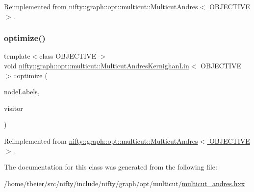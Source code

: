 Reimplemented from \hyperlink{classnifty_1_1graph_1_1opt_1_1multicut_1_1MulticutAndres_a957dcf0e0fe86e29d14a154141a1458f}{nifty\+::graph\+::opt\+::multicut\+::\+Multicut\+Andres$<$ O\+B\+J\+E\+C\+T\+I\+V\+E $>$}.

\mbox{\label{classnifty_1_1graph_1_1opt_1_1multicut_1_1MulticutAndresKernighanLin_af4f27f04beb50edb810b4e750bbc8b46}} 
\subsubsection{\texorpdfstring{optimize()}{optimize()}}
{\footnotesize\ttfamily template$<$class O\+B\+J\+E\+C\+T\+I\+VE $>$ \\
void \hyperlink{classnifty_1_1graph_1_1opt_1_1multicut_1_1MulticutAndresKernighanLin}{nifty\+::graph\+::opt\+::multicut\+::\+Multicut\+Andres\+Kernighan\+Lin}$<$ O\+B\+J\+E\+C\+T\+I\+VE $>$\+::optimize (\begin{DoxyParamCaption}\item[{\hyperlink{classnifty_1_1graph_1_1opt_1_1multicut_1_1MulticutAndres_a6cd9d64abc4a98aa9745ce1ef0d4ecfe}{Node\+Labels\+Type} \&}]{node\+Labels,  }\item[{\hyperlink{classnifty_1_1graph_1_1opt_1_1multicut_1_1MulticutAndres_a295da342b6ebe8a8720cadd1dcce2e57}{Visitor\+Base\+Type} $\ast$}]{visitor }\end{DoxyParamCaption})\hspace{0.3cm}{\ttfamily [virtual]}}



Reimplemented from \hyperlink{classnifty_1_1graph_1_1opt_1_1multicut_1_1MulticutAndres_aa938eb1da7b3af5e0e5935e7bd818c61}{nifty\+::graph\+::opt\+::multicut\+::\+Multicut\+Andres$<$ O\+B\+J\+E\+C\+T\+I\+V\+E $>$}.



The documentation for this class was generated from the following file\+:\begin{DoxyCompactItemize}
\item 
/home/tbeier/src/nifty/include/nifty/graph/opt/multicut/\hyperlink{multicut__andres_8hxx}{multicut\+\_\+andres.\+hxx}\end{DoxyCompactItemize}
